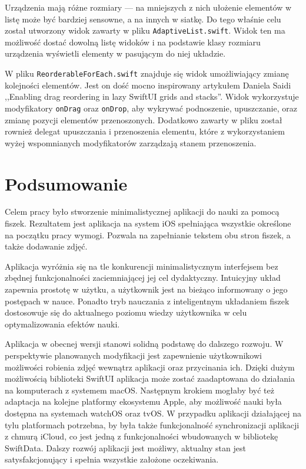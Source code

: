\documentclass[final,a4paper,openany,12pt]{mwbk}
\begin{document}
Urządzenia mają różne rozmiary --- na mniejszych z nich ułożenie elementów w listę może być bardziej sensowne, a na innych w siatkę. Do tego właśnie celu został utworzony widok zawarty w pliku \texttt{AdaptiveList.swift}. Widok ten ma możliwość dostać dowolną listę widoków i na podstawie klasy rozmiaru urządzenia wyświetli elementy w pasującym do niej układzie.

W pliku \texttt{ReorderableForEach.swift} znajduje się widok umożliwiający zmianę kolejności elementów. Jest on dość mocno inspirowany artykułem Daniela Saidi ,,Enabling drag reordering in lazy SwiftUI grids and stacks''\cite{drag_reordering}. Widok wykorzystuje modyfikatory \texttt{onDrag} oraz \texttt{onDrop}, aby wykrywać podnoszenie, upuszczanie, oraz zmianę pozycji elementów przenoszonych. Dodatkowo zawarty w pliku został rownież delegat upuszczania i przenoszenia elementu, które z wykorzystaniem wyżej wspomnianych modyfikatorów zarządzają stanem przenoszenia.


\chapter*{Podsumowanie}

Celem pracy było stworzenie minimalistycznej aplikacji do nauki za pomocą fiszek. Rezultatem jest aplikacja na system iOS spełniająca wszystkie określone na początku pracy wymogi. Pozwala na zapełnianie tekstem obu stron fiszek, a także dodawanie zdjęć.

Aplikacja wyróżnia się na tle konkurencji minimalistycznym interfejsem bez zbędnej funkcjonalności zaciemniającej jej cel dydaktyczny. Intuicyjny układ zapewnia prostotę w użytku, a użytkownik jest na bieżąco informowany o jego postępach w nauce. Ponadto tryb nauczania z inteligentnym układaniem fiszek dostosowuje się do aktualnego poziomu wiedzy użytkownika w celu optymalizowania efektów nauki. 

Aplikacja w obecnej wersji stanowi solidną podstawę do dalszego rozwoju. W perspektywie planowanych modyfikacji jest zapewnienie użytkownikowi możliwości robienia zdjęć wewnątrz aplikacji oraz przycinania ich. Dzięki dużym możliwością biblioteki SwiftUI aplikacja może zostać zaadaptowana do działania na komputerach z systemem macOS. Następnym krokiem mogłaby być też adaptacja na kolejne platformy ekosystemu Apple, aby możliwość nauki była dostępna na systemach watchOS oraz tvOS. W przypadku aplikacji działającej na tylu platformach potrzebna, by była także funkcjonalność synchronizacji aplikacji z chmurą iCloud, co jest jedną z funkcjonalności wbudowanych w bibliotekę SwiftData.
Dalszy rozwój aplikacji jest możliwy, aktualny stan jest satysfakcjonujący i spełnia wszystkie założone oczekiwania.







\end{document}
